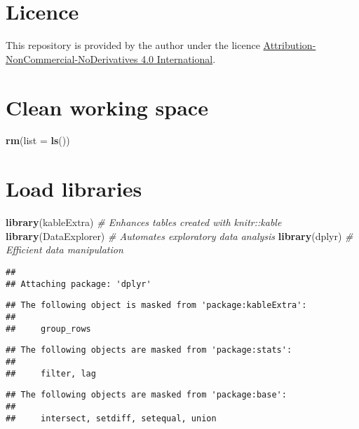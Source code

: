 \documentclass[
]{article}
\newenvironment{Shaded}{\begin{snugshade}}{\end{snugshade}}
\newcommand{\AttributeTok}[1]{\textcolor[rgb]{0.13,0.29,0.53}{#1}}
\newcommand{\CommentTok}[1]{\textcolor[rgb]{0.56,0.35,0.01}{\textit{#1}}}
\newcommand{\FunctionTok}[1]{\textcolor[rgb]{0.13,0.29,0.53}{\textbf{#1}}}
\newcommand{\NormalTok}[1]{#1}
\begin{document}
\section{Licence}\label{licence}

This repository is provided by the author under the licence \href{https://creativecommons.org/licenses/by-nc-nd/4.0/deed.en}{Attribution-NonCommercial-NoDerivatives 4.0 International}.

\section{Clean working space}\label{clean-working-space}

\begin{Shaded}
\begin{Highlighting}[]
\FunctionTok{rm}\NormalTok{(}\AttributeTok{list =} \FunctionTok{ls}\NormalTok{())}
\end{Highlighting}
\end{Shaded}

\section{Load libraries}\label{load-libraries}

\begin{Shaded}
\begin{Highlighting}[]
\FunctionTok{library}\NormalTok{(kableExtra)       }\CommentTok{\# Enhances tables created with \textquotesingle{}knitr::kable\textquotesingle{}}
\FunctionTok{library}\NormalTok{(DataExplorer)     }\CommentTok{\# Automates exploratory data analysis}
\FunctionTok{library}\NormalTok{(dplyr)            }\CommentTok{\# Efficient data manipulation}
\end{Highlighting}
\end{Shaded}

\begin{verbatim}
## 
## Attaching package: 'dplyr'
\end{verbatim}

\begin{verbatim}
## The following object is masked from 'package:kableExtra':
## 
##     group_rows
\end{verbatim}

\begin{verbatim}
## The following objects are masked from 'package:stats':
## 
##     filter, lag
\end{verbatim}

\begin{verbatim}
## The following objects are masked from 'package:base':
## 
##     intersect, setdiff, setequal, union
\end{verbatim}
\end{document}
